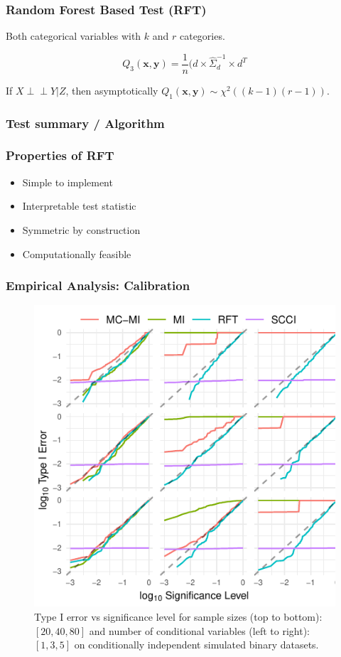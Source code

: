 \documentclass{beamer}
\def\ci{\perp\!\!\!\!\!\perp}
\begin{document}
\begin{frame}
	\frametitle{Random Forest Based Test (RFT)}
	Both categorical variables with $ k $ and $ r $ categories.


	$$ Q_3(\bm{x}, \bm{y}) = \frac{1}{n} (d \times \hat{\Sigma}_d^{-1} \times d^T $$

	If $ X \ci Y | Z $, then asymptotically $ Q_1(\bm{x}, \bm{y}) \sim
	\chi^2((k-1)(r-1)) $.
\end{frame}

\begin{frame}
	\frametitle{Test summary / Algorithm}

\end{frame}

\begin{frame}
	\frametitle{Properties of RFT}
	\begin{itemize}
		\item Simple to implement
		\item Interpretable test statistic
		\item Symmetric by construction
		\item Computationally feasible
	\end{itemize}
\end{frame}


\begin{frame}
	\frametitle{Empirical Analysis: Calibration}
	\begin{figure}
		\centering
		\includegraphics[scale=0.8]{imgs/calibration_add_vars.pdf}
		\caption{Type I error vs significance level for sample sizes (top to
		bottom): $ [20, 40, 80] $ and number of conditional variables (left to
		right): $ [1, 3, 5] $ on conditionally independent simulated binary
		datasets.}
	\end{figure}
\end{frame}
\end{document}
